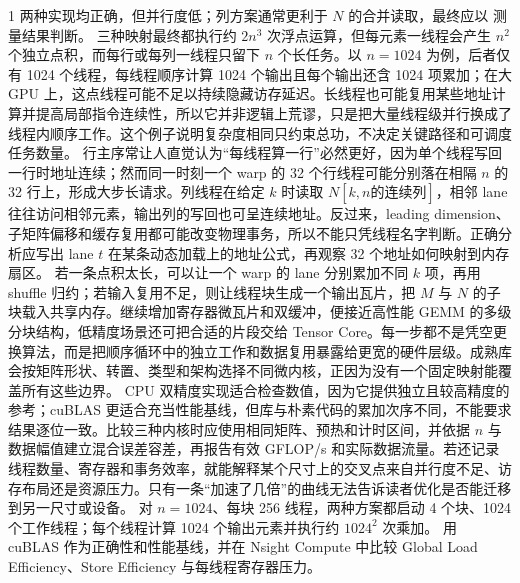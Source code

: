 \begin{solutionexercise}{1}
\conclusionheading 两种实现均正确，但并行度低；列方案通常更利于 $N$ 的合并读取，最终应以
测量结果判断。
\discussionheading
{}
三种映射最终都执行约 $2n^3$ 次浮点运算，但每元素一线程会产生 $n^2$ 个独立点积，而每行或每列一线程只留下 $n$ 个长任务。以 $n=1024$ 为例，后者仅有 1024 个线程，每线程顺序计算 1024 个输出且每个输出还含 1024 项累加；在大 GPU 上，这点线程可能不足以持续隐藏访存延迟。长线程也可能复用某些地址计算并提高局部指令连续性，所以它并非逻辑上荒谬，只是把大量线程级并行换成了线程内顺序工作。这个例子说明复杂度相同只约束总功，不决定关键路径和可调度任务数量。
行主序常让人直觉认为“每线程算一行”必然更好，因为单个线程写回一行时地址连续；然而同一时刻一个 warp 的 32 个行线程可能分别落在相隔 $n$ 的 32 行上，形成大步长请求。列线程在给定 $k$ 时读取 $N[k,n\text{的连续列}]$，相邻 lane 往往访问相邻元素，输出列的写回也可呈连续地址。反过来，leading dimension、子矩阵偏移和缓存复用都可能改变物理事务，所以不能只凭线程名字判断。正确分析应写出 lane $t$ 在某条动态加载上的地址公式，再观察 32 个地址如何映射到内存扇区。
若一条点积太长，可以让一个 warp 的 lane 分别累加不同 $k$ 项，再用 shuffle 归约；若输入复用不足，则让线程块生成一个输出瓦片，把 $M$ 与 $N$ 的子块载入共享内存。继续增加寄存器微瓦片和双缓冲，便接近高性能 GEMM 的多级分块结构，低精度场景还可把合适的片段交给 Tensor Core。每一步都不是凭空更换算法，而是把顺序循环中的独立工作和数据复用暴露给更宽的硬件层级。成熟库会按矩阵形状、转置、类型和架构选择不同微内核，正因为没有一个固定映射能覆盖所有这些边界。
CPU 双精度实现适合检查数值，因为它提供独立且较高精度的参考；cuBLAS 更适合充当性能基线，但库与朴素代码的累加次序不同，不能要求结果逐位一致。比较三种内核时应使用相同矩阵、预热和计时区间，并依据 $n$ 与数据幅值建立混合误差容差，再报告有效 GFLOP/s 和实际数据流量。若还记录线程数量、寄存器和事务效率，就能解释某个尺寸上的交叉点来自并行度不足、访存布局还是资源压力。只有一条“加速了几倍”的曲线无法告诉读者优化是否能迁移到另一尺寸或设备。
\variantheading 对 $n=1024$、每块 256 线程，两种方案都启动 4 个块、1024 个工作线程；每个线程计算 1024 个输出元素并执行约 $1024^2$ 次乘加。
\practiceheading 用 cuBLAS  作为正确性和性能基线，并在 Nsight Compute 中比较 Global Load Efficiency、Store Efficiency 与每线程寄存器压力。
\end{solutionexercise}

